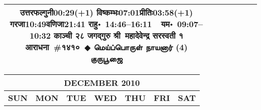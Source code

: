 \documentclass[a3paper,12pt,landscape]{article}
\newcommand{\eventsep}{~$\Diamondblack$ }
\newcommand{\To}{\hspace{1pt}\raisebox{0pt}{\tiny\RIGHTarrow}\hspace{1pt}}
\newcommand{\tamil}[1]{%
{\fontspec[Scale=0.9,FakeStretch=0.9]{Noto Sans Tamil} \footnotesize #1}}
\newcommand{\rahuyama}[2]{%
{राहु॰~\textsf{#1}~~यम॰~\textsf{#2}}
}
\begin{document}
\begin{center}
\begin{tabular}{|c|c|c|c|c|c|c|}
{{\mbox{उत्तरफल्गुनी\To{}\textsf{00:29(+1)\hspace{2ex}}}}%
{\mbox{विष्कम्भः\To{}\textsf{07:01\hspace{2ex}}}\mbox{प्रीतिः\To{}\textsf{03:58(+1)\hspace{2ex}}}}%
{\mbox{गरजा\To{}\textsf{10:49\hspace{2ex}}}\mbox{वणिजा\To{}\textsf{21:41\hspace{2ex}}}}}%
{\rahuyama{14:46--16:11}{09:07--10:32}}%
{काञ्ची २८ जगद्गुरु श्री~महादेवेन्द्र सरस्वती १ आराधना~\#{१४१०}\eventsep \tamil{மெய்ப்பொருள் நாயனார் (4) குருபூஜை}}
&
\mbox{}  & %
\mbox{}  & %
\mbox{}  & %
\\ \hline
\end{tabular}



\begin{tabular}{|c|c|c|c|c|c|c|}
\multicolumn{7}{c}{\Large \bfseries \sffamily DECEMBER 2010}\\[3mm]
\hline
\textbf{\textsf{SUN}} & \textbf{\textsf{MON}} & \textbf{\textsf{TUE}} & \textbf{\textsf{WED}} & \textbf{\textsf{THU}} & \textbf{\textsf{FRI}} & \textbf{\textsf{SAT}} \\ \hline


\end{tabular}
\end{center}
\end{document}
